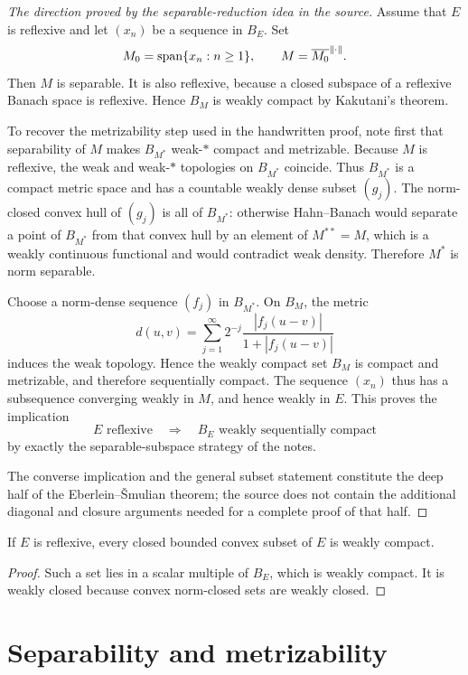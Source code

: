 \begin{proof}[The direction proved by the separable-reduction idea in the source]
Assume that $E$ is reflexive and let $(x_n)$ be a sequence in $B_E$.  Set
\[
  M_0=\operatorname{span}\{x_n:n\ge1\},
  \qquad
  M=\overline{M_0}^{\|\cdot\|}.
\]
Then $M$ is separable.  It is also reflexive, because a closed subspace of a
reflexive Banach space is reflexive.  Hence $B_M$ is weakly compact by
Kakutani's theorem.

To recover the metrizability step used in the handwritten proof, note first
that separability of $M$ makes $B_{M^*}$ weak-$*$ compact and metrizable.
Because $M$ is reflexive, the weak and weak-$*$ topologies on $B_{M^*}$
coincide.  Thus $B_{M^*}$ is a compact metric space and has a countable
weakly dense subset $(g_j)$.  The norm-closed convex hull of $(g_j)$ is all
of $B_{M^*}$: otherwise Hahn--Banach would separate a point of $B_{M^*}$
from that convex hull by an element of $M^{**}=M$, which is a weakly
continuous functional and would contradict weak density.  Therefore $M^*$
is norm separable.

Choose a norm-dense sequence $(f_j)$ in $B_{M^*}$.  On $B_M$, the metric
\[
  d(u,v)=\sum_{j=1}^{\infty}2^{-j}
         \frac{|f_j(u-v)|}{1+|f_j(u-v)|}
\]
induces the weak topology.  Hence the weakly compact set $B_M$ is compact
and metrizable, and therefore sequentially compact.  The sequence $(x_n)$
thus has a subsequence converging weakly in $M$, and hence weakly in $E$.
This proves the implication
\[
  E\text{ reflexive}\quad\Longrightarrow\quad
  B_E\text{ weakly sequentially compact}
\]
by exactly the separable-subspace strategy of the notes.

The converse implication and the general subset statement constitute the
deep half of the Eberlein--\v{S}mulian theorem; the source does not contain
the additional diagonal and closure arguments needed for a complete proof of
that half.
\end{proof}

\begin{notecorollary}
If $E$ is reflexive, every closed bounded convex subset of $E$ is weakly
compact.
\end{notecorollary}

\begin{proof}
Such a set lies in a scalar multiple of $B_E$, which is weakly compact.  It is
weakly closed because convex norm-closed sets are weakly closed.
\end{proof}

\section{Separability and metrizability}

